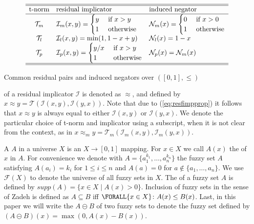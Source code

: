 \documentclass{tlp}
\newcommand{\Fuzzy}[1]{\ensuremath{\mathcal{F}({#1})}}
\newcommand{\supp}[1]{\ensuremath{\mathit{supp}(#1)}}
\newcommand{\fneg}[2]{\ensuremath{\mathcal{N}_{#1}(#2)}}
\newcommand{\lneg}[1]{\fneg{l}{#1}}
\newcommand{\mneg}[1]{\fneg{m}{#1}}
\newcommand{\pneg}[1]{\fneg{p}{#1}}
\newcommand{\feq}{\ensuremath{\approx}}
\newcommand{\fsetminus}{\circleddash}
\newcommand{\pretnorm}{\mathcal{T}}
\newcommand{\prefimp}{\mathcal{I}}
\newcommand{\SUCHTHAT}{\colon}
\newcommand{\Forall}[2]{\ensuremath{\FORALL{#1} \SUCHTHAT {#2}}}
\begin{document}
\begin{table}
\[\begin{array}{cll}
\hline
\hline
\textnormal{t-norm} & \textnormal{residual implicator} & \textnormal{induced negator}\\
\hline
  \pretnorm_m
  & \prefimp_m(x,y) = \begin{cases}
		     y & \mbox{~if~} x > y\\
		     1 & \mbox{~otherwise}
                    \end{cases}
  & \mneg{x} = \begin{cases}
                           0 & \mbox{~if~} x > 0\\
			   1 & \mbox{~otherwise}
                          \end{cases}\\
\pretnorm_l
 & \prefimp_l(x,y) = \min(1,1-x+y)
 & \lneg{x} = 1-x\\ 
\pretnorm_p
 & \prefimp_p(x,y) = \begin{cases}
                      y/x & \mbox{~if~} x > y\\
		      1 & \mbox{~otherwise}
                     \end{cases}
 & \pneg{x} = \mneg{x}\\
\hline
\hline
\end{array}\]
\caption{Common residual pairs and induced negators over $([0,1],\leq)$}
\label{tab:fuzzy-operators-2}
\end{table}

 of a residual implicator $\prefimp$ is denoted as $\feq$, and defined by $x \feq y = \mathcal{T}(\mathcal{I}(x,y),\mathcal{I}(y,x))$. Note that due to (\ref{eq:resfimpprop}) it follows that $x \feq y$ is always equal to either $\mathcal{I}(x,y)$ or $\mathcal{I}(y,x)$. We denote the particular choice of t-norm and implicator using a subscript, when it is not clear from the context, as in $x \feq_m y = \pretnorm_m(\prefimp_m(x,y),\prefimp_m(y,x))$.



A  $A$ in a universe $X$ is an $X \to [0,1]$ mapping. For $x \in X$ we call $A(x)$ the  of $x$ in $A$. For convenience we denote with $A = \{a_1^{k_1},\ldots,a_n^{k_n}\}$ the fuzzy set $A$ satisfying $A(a_i) = k_i$ for $1 \leq i \leq n$ and $A(a) = 0$ for $a \not\in \{a_1,\ldots,a_n\}$. We use $\Fuzzy{X}$ to denote the universe of all fuzzy sets in $X$. The  of a fuzzy set $A$ is defined by $\supp{A} = \{ x \in X \mid A(x) > 0 \}$. Inclusion of fuzzy sets in the sense of Zadeh is defined as $A \subseteq B$ iff $\Forall{x \in X}{A(x) \leq B(x)}$.
Last, in this paper we will write the  $A \fsetminus B$ of two fuzzy sets to denote the fuzzy set defined by $(A \fsetminus B)(x) = \max(0,A(x)-B(x))$.
\end{document}
